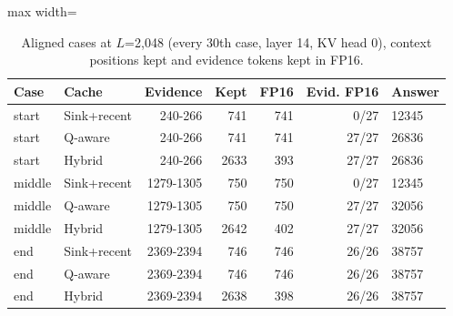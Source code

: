 \begin{table}[!htb]
\centering
\scriptsize
\setlength{\tabcolsep}{3.5pt}
\caption{Aligned cases at $L$=2,048 (every 30th case, layer 14, KV head 0), context positions kept and evidence tokens kept in FP16.}
\label{tab:t2cmasks2048}
\begin{adjustbox}{max width=\linewidth}
\begin{tabular}{llrrrrl}
\toprule
Case & Cache & Evidence & Kept & FP16 & Evid. FP16 & Answer \\
\midrule
start & Sink+recent & 240-266 & 741 & 741 & 0/27 & 12345 \\
start & Q-aware & 240-266 & 741 & 741 & 27/27 & 26836 \\
start & Hybrid & 240-266 & 2633 & 393 & 27/27 & 26836 \\
middle & Sink+recent & 1279-1305 & 750 & 750 & 0/27 & 12345 \\
middle & Q-aware & 1279-1305 & 750 & 750 & 27/27 & 32056 \\
middle & Hybrid & 1279-1305 & 2642 & 402 & 27/27 & 32056 \\
end & Sink+recent & 2369-2394 & 746 & 746 & 26/26 & 38757 \\
end & Q-aware & 2369-2394 & 746 & 746 & 26/26 & 38757 \\
end & Hybrid & 2369-2394 & 2638 & 398 & 26/26 & 38757 \\
\bottomrule
\end{tabular}
\end{adjustbox}
\end{table}
